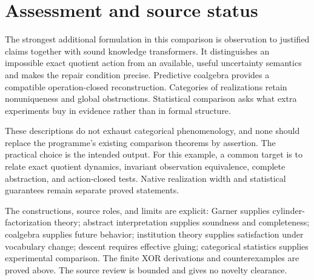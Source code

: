 \documentclass[11pt]{article}
\theoremstyle{definition}
\begin{document}
\section{Assessment and source status}
The strongest additional formulation in this comparison is observation to justified claims together with sound knowledge transformers. It distinguishes an impossible exact quotient action from an available, useful uncertainty semantics and makes the repair condition precise. Predictive coalgebra provides a compatible operation-closed reconstruction. Categories of realizations retain nonuniqueness and global obstructions. Statistical comparison asks what extra experiments buy in evidence rather than in formal structure.

These descriptions do not exhaust categorical phenomenology, and none should replace the programme's existing comparison theorems by assertion. The practical choice is the intended output. For this example, a common target is to relate exact quotient dynamics, invariant observation equivalence, complete abstraction, and action-closed tests. Native realization width and statistical guarantees remain separate proved statements.

The constructions, source roles, and limits are explicit: Garner supplies cylinder-factorization theory; abstract interpretation supplies soundness and completeness; coalgebra supplies future behavior; institution theory supplies satisfaction under vocabulary change; descent requires effective gluing; categorical statistics supplies experimental comparison. The finite XOR derivations and counterexamples are proved above. The source review is bounded and gives no novelty clearance.
\end{document}

